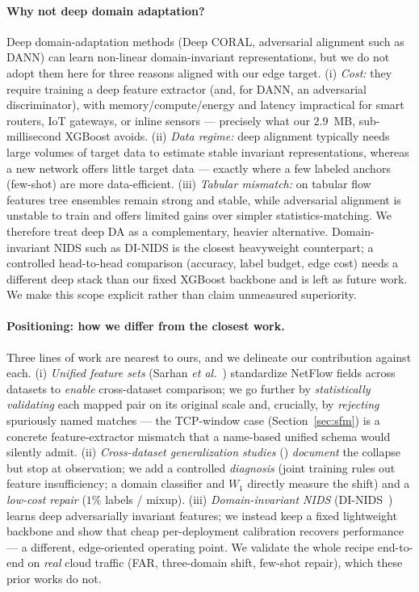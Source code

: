 \documentclass[preprint,12pt,authoryear]{elsarticle}
\begin{document}
\paragraph{Why not deep domain adaptation?} Deep domain-adaptation methods (Deep
CORAL, adversarial alignment such as DANN) can learn non-linear domain-invariant
representations, but we do not adopt them here for three reasons aligned with our
edge target. (i) \emph{Cost:} they require training a deep feature extractor (and,
for DANN, an adversarial discriminator), with memory/compute/energy and latency
impractical for smart routers, IoT gateways, or inline sensors --- precisely what
our $2.9$~MB, sub-millisecond XGBoost avoids. (ii) \emph{Data regime:} deep
alignment typically needs large volumes of target data to estimate stable invariant
representations, whereas a new network offers little target data --- exactly where a
few labeled anchors (few-shot) are more data-efficient. (iii) \emph{Tabular
mismatch:} on tabular flow features tree ensembles remain strong and stable, while
adversarial alignment is unstable to train and offers limited gains over simpler
statistics-matching. We therefore treat deep DA as a complementary, heavier
alternative. Domain-invariant NIDS such as DI-NIDS \citep{layeghy} is the closest
heavyweight counterpart; a controlled head-to-head comparison (accuracy, label
budget, edge cost) needs a different deep stack than our fixed XGBoost backbone and
is left as future work. We make this scope explicit rather than claim unmeasured
superiority.


\paragraph{Positioning: how we differ from the closest work.} Three lines of work
are nearest to ours, and we delineate our contribution against each. (i) \emph{Unified
feature sets} (Sarhan \emph{et al.}~\citep{sarhan,sarhannf}) standardize NetFlow
fields across datasets to \emph{enable} cross-dataset comparison; we go further by
\emph{statistically validating} each mapped pair on its original scale and, crucially,
by \emph{rejecting} spuriously named matches --- the TCP-window case
(Section~\ref{sec:sfm}) is a concrete feature-extractor mismatch that a name-based
unified schema would silently admit. (ii) \emph{Cross-dataset generalization studies}
(\citep{cantone,dhooge,verkerken}) \emph{document} the collapse but stop at observation;
we add a controlled \emph{diagnosis} (joint training rules out feature insufficiency; a
domain classifier and $W_1$ directly measure the shift) and a \emph{low-cost repair}
($1\%$ labels / mixup). (iii) \emph{Domain-invariant NIDS} (DI-NIDS~\citep{layeghy})
learns deep adversarially invariant features; we instead keep a fixed lightweight
backbone and show that cheap per-deployment calibration recovers performance --- a
different, edge-oriented operating point. We validate the whole recipe end-to-end on
\emph{real} cloud traffic (FAR, three-domain shift, few-shot repair), which these prior
works do not.
\FloatBarrier
\end{document}
